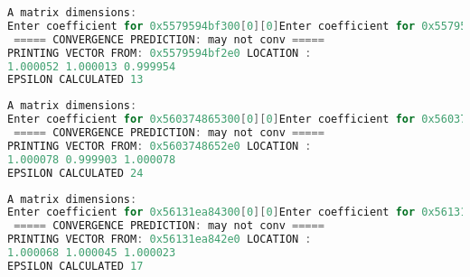 \begin{lstlisting}[language=C,inputencoding=utf8, basicstyle=\fontsize{8}{10}\selectfont,caption=Execution with A3 matrix]
A matrix dimensions: 
Enter coefficient for 0x5579594bf300[0][0]Enter coefficient for 0x5579594bf300[0][1]Enter coefficient for 0x5579594bf300[0][2]Enter coefficient for 0x5579594bf300[1][0]Enter coefficient for 0x5579594bf300[1][1]Enter coefficient for 0x5579594bf300[1][2]Enter coefficient for 0x5579594bf300[2][0]Enter coefficient for 0x5579594bf300[2][1]Enter coefficient for 0x5579594bf300[2][2]
 ===== CONVERGENCE PREDICTION: may not conv =====
PRINTING VECTOR FROM: 0x5579594bf2e0 LOCATION :
1.000052 1.000013 0.999954
EPSILON CALCULATED 13
\end{lstlisting}
\begin{lstlisting}[language=C,inputencoding=utf8, basicstyle=\fontsize{8}{10}\selectfont,caption=Execution with A4 matrix]
A matrix dimensions: 
Enter coefficient for 0x560374865300[0][0]Enter coefficient for 0x560374865300[0][1]Enter coefficient for 0x560374865300[0][2]Enter coefficient for 0x560374865300[1][0]Enter coefficient for 0x560374865300[1][1]Enter coefficient for 0x560374865300[1][2]Enter coefficient for 0x560374865300[2][0]Enter coefficient for 0x560374865300[2][1]Enter coefficient for 0x560374865300[2][2]
 ===== CONVERGENCE PREDICTION: may not conv =====
PRINTING VECTOR FROM: 0x5603748652e0 LOCATION :
1.000078 0.999903 1.000078
EPSILON CALCULATED 24
\end{lstlisting}
\begin{lstlisting}[language=C,inputencoding=utf8, basicstyle=\fontsize{8}{10}\selectfont,caption=Execution with A5 dimensions: 3x3]
A matrix dimensions: 
Enter coefficient for 0x56131ea84300[0][0]Enter coefficient for 0x56131ea84300[0][1]Enter coefficient for 0x56131ea84300[0][2]Enter coefficient for 0x56131ea84300[1][0]Enter coefficient for 0x56131ea84300[1][1]Enter coefficient for 0x56131ea84300[1][2]Enter coefficient for 0x56131ea84300[2][0]Enter coefficient for 0x56131ea84300[2][1]Enter coefficient for 0x56131ea84300[2][2]
 ===== CONVERGENCE PREDICTION: may not conv =====
PRINTING VECTOR FROM: 0x56131ea842e0 LOCATION :
1.000068 1.000045 1.000023
EPSILON CALCULATED 17
\end{lstlisting}
